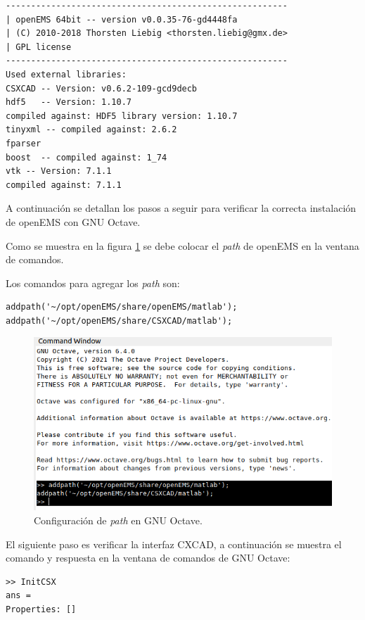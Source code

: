 \documentclass[
    11pt,
    spanish,
    a4paper
]{article}
\begin{document}
\begin{verbatim}
--------------------------------------------------------
| openEMS 64bit -- version v0.0.35-76-gd4448fa
| (C) 2010-2018 Thorsten Liebig <thorsten.liebig@gmx.de>
| GPL license
--------------------------------------------------------
Used external libraries:
CSXCAD -- Version: v0.6.2-109-gcd9decb
hdf5   -- Version: 1.10.7
compiled against: HDF5 library version: 1.10.7
tinyxml -- compiled against: 2.6.2
fparser
boost  -- compiled against: 1_74
vtk -- Version: 7.1.1
compiled against: 7.1.1
\end{verbatim}

A continuación se detallan los pasos a seguir para verificar la correcta
instalación de openEMS con GNU Octave.

Como se muestra en la figura \ref{fig:octavepath} se debe colocar el \emph{path}
de openEMS en la ventana de comandos.

Los comandos para agregar los \emph{path} son:

\begin{verbatim}
addpath('~/opt/openEMS/share/openEMS/matlab');
addpath('~/opt/openEMS/share/CSXCAD/matlab');
\end{verbatim}

\begin{figure}[htbp]
	\centering
	\includegraphics[width=\textwidth]{./img/octavepath.png}
	\caption{Configuración de \emph{path} en GNU Octave.}
	\label{fig:octavepath}
\end{figure}

El siguiente paso es verificar la interfaz CXCAD, a continuación se muestra el
comando y respuesta en la ventana de comandos de GNU Octave:

\begin{verbatim}
>> InitCSX
ans = 
Properties: []
\end{verbatim}
\end{document}
